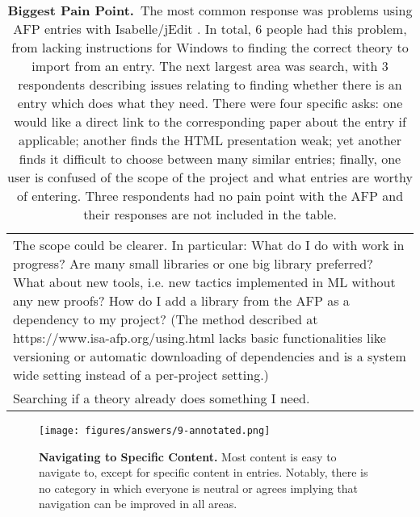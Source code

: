 \documentclass[bsc,frontabs,oneside,singlespacing,parskip,deptreport,logo]{infthesis}
\begin{document}
\begin{table}[h!]
\begin{tabularx}{\textwidth}{X}
\footnotesize
The scope could be clearer. In particular: What do I do with work in progress? Are many small libraries or one big library preferred? What about new tools, i.e. new tactics implemented in ML without any new proofs? How do I add a library from the AFP as a dependency to my project? (The method described at  https://www.isa-afp.org/using.html lacks basic functionalities like versioning or automatic downloading of dependencies and is a system wide setting instead of a per-project setting.)\\
\footnotesize
Searching if a theory already does something I need.\\
\hline
\end{tabularx}
\vspace{0.3cm}
\caption{\textbf{Biggest Pain Point.}~The most common response was problems using AFP entries with Isabelle/jEdit \cite{wenzel2012isabelle}. In total, 6 people had this problem, from lacking instructions for Windows to finding the correct theory to import from an entry. The next largest area was search, with 3 respondents describing issues relating to finding whether there is an entry which does what they need. There were four specific asks: one would like a direct link to the corresponding paper about the entry if applicable; another finds the HTML presentation weak; yet another finds it difficult to choose between many similar entries; finally, one user is confused of the scope of the project and what entries are worthy of entering. Three respondents had no pain point with the AFP and their responses are not included in the table.}
    \label{fig:pain-point}
\end{table}

\clearpage 

\begin{figure}[h!]
    \centering
    \texttt{[image: figures/answers/9-annotated.png]}
    \caption{\textbf{Navigating to Specific Content.}
    Most content is easy to navigate to, except for specific content in entries. Notably, there is no category in which everyone is neutral or agrees implying that navigation can be improved in all areas.}
    \label{fig:navigating-to-specific-content}
\end{figure}

\end{document}
